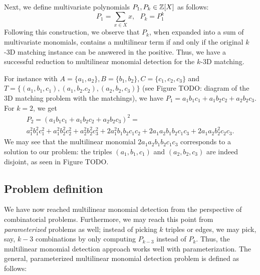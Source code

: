 Next, we define multivariate polynomials $P_1, P_k \in \mathbb Z[X]$ as follows: 
\[
  P_1 = \displaystyle \sum_{x \in X}x, \: \: \: P_k = P_1^k
\]
Following this construction, we observe that $P_k$, 
when expanded into a sum of multivariate monomials, 
contains a multilinear term if and only if the original 
$k$-3D matching instance can be answered in the positive. 
Thus, we have a successful reduction to 
multilinear monomial detection for the $k$-3D matching. 

\sloppy For instance with $A = \{a_1, a_2\}, B = \{b_1, b_2\}, C = \{c_1, c_2, c_3\}$ and 
$T = \{(a_1, b_1, c_1), (a_1, b_2. c_2), (a_2, b_2, c_3)\}$ 
(see Figure TODO: diagram of the 3D matching problem with the matchings), 
we have $P_1 = a_1b_1c_1 + a_1b_2c_2 + a_2b_2c_3$. For $k=2$, we get 
\begin{multline*}
  P_2 = (a_1b_1c_1 + a_1b_2c_2 + a_2b_2c_3)^2 = \\
  a_1^2b_1^2c_1^2 + a_1^2b_2^2c_2^2 + a_2^2b_2^2c_3^2 + 
  2a_1^2b_1b_2c_1c_2 + 2a_1a_2b_1b_2c_1c_3 + 2 a_1a_2b_2^2c_2c_3.
\end{multline*}
We may see that the multilinear monomial $2a_1a_2b_1b_2c_1c_3$ corresponds 
to a solution to our problem: the triples $(a_1,b_1,c_1)$ and $(a_2,b_2,c_3)$ are 
indeed disjoint, as seen in Figure TODO.

\subsection{Problem definition}
\label{sect:problem_definition}

We have now reached multilinear monomial detection from the perspective 
of combinatorial problems. Furthermore, we may reach this point from 
\emph{parameterized} problems as well; instead of picking $k$ triples or edges, 
we may pick, say, $k-3$ combinations by only computing $P_{k-3}$ instead of $P_k$. 
Thus, the multilinear monomial detection approach works well with parameterization. 
The general, parameterized multilinear monomial detection problem is defined as follows: 

\begin{problem}
\end{problem}

